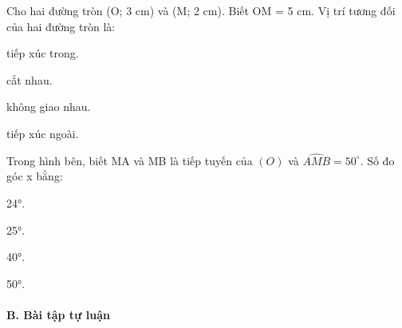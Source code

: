 \documentclass[%
    fontsize=12pt,%
    chapterprefix=false,%
    open=right,%
    twoside=false,%
    numbers=noenddot,%
    headings=optiontohead,%
    final,%
    DIV=15,%
    parskip=half %
]{scrbook}
\begin{document}
\begin{tracnghiem}
\item Cho hai đường tròn (O; 3 cm) và (M; 2 cm). Biết OM = 5 cm. Vị trí tương đối của hai đường tròn là:
\begin{options}
  \item tiếp xúc trong.
  \item cắt nhau.
  \item không giao nhau.
  \item tiếp xúc ngoài.
\end{options}

\item Trong hình bên, biết MA và MB là tiếp tuyến của $(O)$ và $ \widehat{AMB} = 50^\circ $. Số đo góc x bằng:
\begin{options}
  \item 24°.
  \item 25°.
  \item 40°.
  \item 50°.
\end{options}

\end{tracnghiem}

\paragraph{B. Bài tập tự luận}
\end{document}
